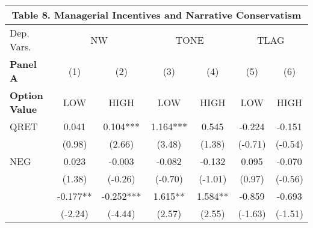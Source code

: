 \begin{table}[htbp] \label{T8}
  \centering
    \begin{tabular}{lcccccc}
    \multicolumn{7}{c}{\textbf{Table 8. Managerial Incentives and Narrative Conservatism}} \\
    \midrule
    \midrule
    Dep. Vars.& \multicolumn{2}{c}{NW} & \multicolumn{2}{c}{TONE} & \multicolumn{2}{c}{TLAG}\\
    \midrule
    \textbf{Panel A}  & (1) & (2) & (3) & (4) & (5) & (6) \\
    \multicolumn{1}{l}{\textbf{Option Value}} & LOW & HIGH & LOW & HIGH & LOW & HIGH \\
    \cmidrule{2-7}
    \multicolumn{1}{l}{QRET} & 0.041 & 0.104*** & 1.164*** & 0.545 & -0.224 & -0.151 \\
      & (0.98) & (2.66) & (3.48) & (1.38) & (-0.71) & (-0.54) \\
    \multicolumn{1}{l}{NEG} & 0.023 & -0.003 & -0.082 & -0.132 & 0.095 & -0.070 \\
      & (1.38) & (-0.26) & (-0.70) & (-1.01) & (0.97) & (-0.56) \\
    \rowcolor[rgb]{ .933,  .925,  .882} \multicolumn{1}{l}{QRET$\times$NEG} & -0.177** & -0.252*** & 1.615** & 1.584** & -0.859 & -0.693 \\
    \rowcolor[rgb]{ .933,  .925,  .882}  & (-2.24) & (-4.44) & (2.57) & (2.55) & (-1.63) & (-1.51) \\

\end{tabular}
\end{table}

